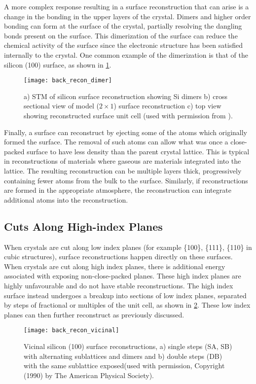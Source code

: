 A more complex response resulting in a surface reconstruction that can arise is a change in the bonding in the upper layers of the crystal.
Dimers and higher order bonding can form at the surface of the crystal, partially resolving the dangling bonds present on the surface.
This dimerization of the surface can reduce the chemical activity of the surface since the electronic structure has been satisfied internally to the crystal\cite{Duke1996}.
One common example of the dimerization is that of the silicon (100) surface, as shown in \cref{fig:back_recon_dimer}.
\begin{figure}
 \centering \texttt{[image: back\_recon\_dimer]}
 \caption[Silicon dimer surface reconstruction]{\label{fig:back_recon_dimer}a) STM of silicon surface reconstruction showing Si dimers b) cross sectional view of model (\(2 \times 1\)) surface reconstruction c) top view showing reconstructed surface unit cell (used with permission from \cite{Zhang1997,Lagally1993}).}
\end{figure}

Finally, a surface can reconstruct by ejecting some of the atoms which originally formed the surface.
The removal of such atoms can allow what was once a close-packed surface to have less density than the parent crystal lattice.
This is typical in reconstructions of materials where gaseous are materials integrated into the lattice.
The resulting reconstruction can be multiple layers thick, progressively containing fewer atoms from the bulk to the surface.
Similarly, if reconstructions are formed in the appropriate atmosphere, the reconstruction can integrate additional atoms into the reconstruction.

\subsection{Cuts Along High-index Planes} When crystals are cut along low index planes (for example \{100\}, \{111\}, \{110\}  in cubic structures), surface reconstructions happen directly on these surfaces.
When crystals are cut along high index planes, there is additional energy associated with exposing non-close-packed planes.
These high index planes are highly unfavourable and do not have stable reconstructions.
The high index surface instead undergoes a breakup into sections of low index planes, separated by steps of fractional or multiples of the unit cell, as shown in \cref{fig:back_recon_vicinal}.
These low index planes can then further reconstruct as previously discussed.
\begin{figure}
 \centering \texttt{[image: back\_recon\_vicinal]}
 \caption[Silicon single and double step surface reconstructions]{\label{fig:back_recon_vicinal}Vicinal silicon (100) surface reconstructions, a) single steps (SA, SB) with alternating sublattices and dimers and b) double steps (DB) with the same sublattice exposed\cite{Alerhand1990}(used with permission, Copyright (1990) by The American Physical Society).}
\end{figure}

